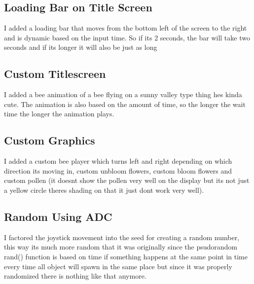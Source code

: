 \documentclass{article}
\begin{document}
\subsection{Loading Bar on Title Screen}
\begin{center}
    I added a loading bar that moves from the bottom left of the screen to the right and is dynamic based on the input time. So if its 2 seconds, the bar will take two seconds and if its longer it will also be just as long
\end{center}
\subsection{Custom Titlescreen}
\begin{center}
    I added a bee animation of a bee flying on a sunny valley type thing hes kinda cute. The animation is also based on the amount of time, so the longer the wait time the longer the animation plays.
\end{center}
\subsection{Custom Graphics}
\begin{center}
    I added a custom bee player which turns left and right depending on which direction its moving in, custom unbloom flowers, custom bloom flowers and custom pollen (it doesnt show the pollen very well on the display but its not just a yellow circle theres shading on that it just dont work very well).
\end{center}
\subsection{Random Using ADC}
\begin{center}
    I factored the joystick movement into the seed for creating a random number, this way its much more random that it was originally since the psudorandom rand() function is based on time if something happens at the same point in time every time all object will spawn in the same place but since it was properly randomized there is nothing like that anymore.
\end{center}
\end{document}
